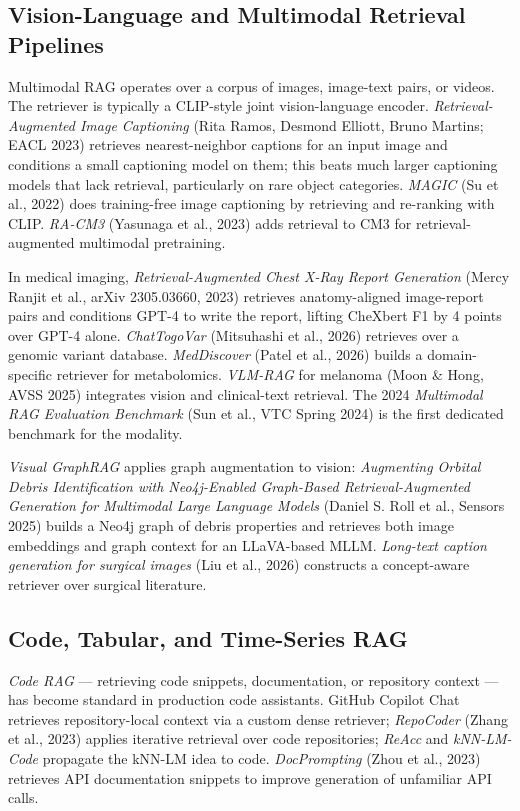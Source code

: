 \subsection{Vision-Language and Multimodal Retrieval Pipelines}\label{vision-language-and-multimodal-retrieval-pipelines}

Multimodal RAG operates over a corpus of images, image-text pairs, or videos. The retriever is typically a CLIP-style joint vision-language encoder. \emph{Retrieval-Augmented Image Captioning} (Rita Ramos, Desmond Elliott, Bruno Martins; EACL 2023) retrieves nearest-neighbor captions for an input image and conditions a small captioning model on them; this beats much larger captioning models that lack retrieval, particularly on rare object categories. \emph{MAGIC} (Su et al., 2022) does training-free image captioning by retrieving and re-ranking with CLIP. \emph{RA-CM3} (Yasunaga et al., 2023) adds retrieval to CM3 for retrieval-augmented multimodal pretraining.

In medical imaging, \emph{Retrieval-Augmented Chest X-Ray Report Generation} (Mercy Ranjit et al., arXiv 2305.03660, 2023) retrieves anatomy-aligned image-report pairs and conditions GPT-4 to write the report, lifting CheXbert F1 by 4 points over GPT-4 alone. \emph{ChatTogoVar} (Mitsuhashi et al., 2026) retrieves over a genomic variant database. \emph{MedDiscover} (Patel et al., 2026) builds a domain-specific retriever for metabolomics. \emph{VLM-RAG} for melanoma (Moon \& Hong, AVSS 2025) integrates vision and clinical-text retrieval. The 2024 \emph{Multimodal RAG Evaluation Benchmark} (Sun et al., VTC Spring 2024) is the first dedicated benchmark for the modality.

\emph{Visual GraphRAG} applies graph augmentation to vision: \emph{Augmenting Orbital Debris Identification with Neo4j-Enabled Graph-Based Retrieval-Augmented Generation for Multimodal Large Language Models} (Daniel S. Roll et al., Sensors 2025) builds a Neo4j graph of debris properties and retrieves both image embeddings and graph context for an LLaVA-based MLLM. \emph{Long-text caption generation for surgical images} (Liu et al., 2026) constructs a concept-aware retriever over surgical literature.

\subsection{Code, Tabular, and Time-Series RAG}\label{code-tabular-and-time-series-rag}

\emph{Code RAG} --- retrieving code snippets, documentation, or repository context --- has become standard in production code assistants. GitHub Copilot Chat retrieves repository-local context via a custom dense retriever; \emph{RepoCoder} (Zhang et al., 2023) applies iterative retrieval over code repositories; \emph{ReAcc} and \emph{kNN-LM-Code} propagate the kNN-LM idea to code. \emph{DocPrompting} (Zhou et al., 2023) retrieves API documentation snippets to improve generation of unfamiliar API calls.

